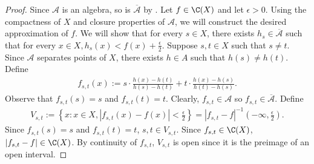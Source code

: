 \begin{proof}
Since $\mathcal{A}$ is an algebra, so is $\overline{\mathcal{A}}$ by .
Let $f \in \C(X)$ and let $\epsilon > 0$. Using the compactness of $X$ and closure properties of $\mathcal{A}$, we will construct the desired approximation of $f$.
We will show that for every $s \in X$, there exists $h_s \in \overline{\mathcal{A}}$ such that for every $x \in X, h_s(x) < f(x) + \frac{\epsilon}{2}$.
Suppose $s, t \in X$ such that $s \neq t$. Since $\mathcal{A}$ separates points of $X$, there exists $h \in A$ such that $h(s) \neq h(t)$. Define 
\begin{align*}
    f_{s, t} (x) := s \cdot \frac{h(x) - h(t)}{h(s) - h(t)} + t  \cdot \frac{h(x) - h(s)}{h(t) - h(s)}.
\end{align*}
Observe that $f_{s, t} (s) = s$ and $f_{s, t} (t) = t$. Clearly, $f_{s,t} \in \mathcal{A}$ so $f_{s,t} \in  \overline{\mathcal{A}}$. Define 
\begin{align*}
    V_{s, t} := \left \{ x :  x \in X, |f_{s,t}(x) - f(x)| < \frac{\epsilon}{2} \right \} =| f_{s,t} - f|^{-1} (-\infty, \frac{\epsilon}{2}).
\end{align*}
Since $f_{s, t} (s) = s$ and $f_{s, t} (t) = t$, $s, t \in V_{s, t}$. Since $f_{s,t} \in \C(X)$, $| f_{s,t} - f | \in \C(X)$. By continuity of $f_{s,t}$, $V_{s, t}$ is open since it is the preimage of an open interval. 


\end{proof}
